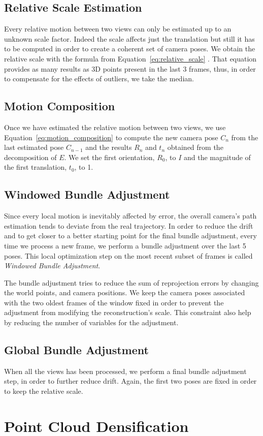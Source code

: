 \subsection{Relative Scale Estimation}
Every relative motion between two views can only be estimated up to an unknown 
scale factor. Indeed the scale affects just the translation but still it has to 
be computed in order to create a coherent set of camera poses.
We obtain the relative scale with the formula from 
Equation~\ref{eq:relative_scale} \cite{scaramuzzaVisualOdometryI}.
That equation provides as many results as 3D points present in the last 3 
frames, thus, in order to compensate for the effects of outliers, we take the 
median.

\subsection{Motion Composition}
Once we have estimated the relative motion between two views, we use 
Equation~\ref{eq:motion_composition} to compute the new camera pose $C_n$ from 
the last estimated pose $C_{n-1}$ and the results $R_{n}$ and $t_n$ obtained 
from the decomposition of $E$.
We set the first orientation, $R_0$, to $I$ and the magnitude of the first 
translation, $t_0$, to 1.

\subsection{Windowed Bundle Adjustment}
Since every local motion is inevitably affected by error, the overall 
camera's path estimation tends to deviate from the real trajectory.
In order to reduce the drift and to get closer to a better starting point 
for the final bundle adjustment, every time we process a new frame, 
we perform a bundle adjustment over the last 5 poses.
This local optimization step on the most recent subset of frames is called
\textit{Windowed Bundle Adjustment}.

The bundle adjustment tries to reduce the sum of reprojection errors by changing the
world points, and camera positions. 
We keep the camera poses associated with the two oldest frames of the window 
fixed in order to prevent the adjustment from modifying the reconstruction's 
scale. This constraint also help by reducing the number of variables for the 
adjustment.

\subsection{Global Bundle Adjustment}
When all the views has been processed, we perform a final bundle adjustment 
step, in order to further reduce drift. Again, the first two poses are fixed in 
order to keep the relative scale.

\section{Point Cloud Densification}
\label{sec:pipeline_densification}
